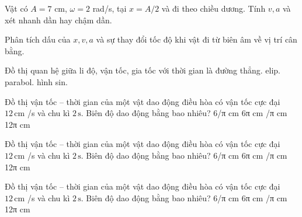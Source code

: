 \begin{ex}
Vật có $A=7$ cm, $\omega=2$ rad/s, tại $x=A/2$ và đi theo chiều dương. Tính $v,a$ và xét nhanh dần hay chậm dần.
\choiceTF

\end{ex}

\begin{ex}
Phân tích dấu của $x,v,a$ và sự thay đổi tốc độ khi vật đi từ biên âm về vị trí cân bằng.
\choiceTF

\end{ex}

\begin{ex}
Đồ thị quan hệ giữa li độ, vận tốc, gia tốc với thời gian là đường
\choice
{thẳng.}
{elip.}
{parabol.}
{\True hình sin.}
\end{ex}

\begin{ex}
Đồ thị vận tốc – thời gian của một vật dao động điều hòa có vận tốc cực đại $12\,\text{cm}$ /s và chu kì $2\,\text{s}$. Biên độ dao động bằng bao nhiêu?
\choice
{6/π cm}
{6π cm}
{/π cm}
{12π cm}
\end{ex}

\begin{ex}
Đồ thị vận tốc – thời gian của một vật dao động điều hòa có vận tốc cực đại $12\,\text{cm}$ /s và chu kì $2\,\text{s}$. Biên độ dao động bằng bao nhiêu?
\choice
{6/π cm}
{6π cm}
{/π cm}
{12π cm}
\end{ex}

\begin{ex}
Đồ thị vận tốc – thời gian của một vật dao động điều hòa có vận tốc cực đại $12\,\text{cm}$ /s và chu kì $2\,\text{s}$. Biên độ dao động bằng bao nhiêu?
\choice
{6/π cm}
{6π cm}
{/π cm}
{12π cm}
\end{ex}

